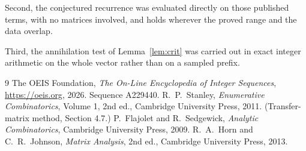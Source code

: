 \documentclass[11pt,a4paper]{article}
\theoremstyle{plain}
\theoremstyle{definition}
\begin{document}
Second, the conjectured recurrence was evaluated directly on those published terms, with no
matrices involved, and holds wherever the proved range and the data overlap.

Third, the annihilation test of Lemma~\ref{lem:crit} was carried out in exact integer
arithmetic on the whole vector rather than on a sampled prefix.

\begin{thebibliography}{9}
 The OEIS Foundation, \emph{The On-Line Encyclopedia of Integer
Sequences}, \url{https://oeis.org}, 2026. Sequence A229440.
 R.~P.~Stanley, \emph{Enumerative Combinatorics}, Volume 1, 2nd ed.,
Cambridge University Press, 2011. (Transfer-matrix method, Section 4.7.)
 P.~Flajolet and R.~Sedgewick, \emph{Analytic Combinatorics}, Cambridge
University Press, 2009.
 R.~A.~Horn and C.~R.~Johnson, \emph{Matrix Analysis}, 2nd ed., Cambridge
University Press, 2013.
\end{thebibliography}
\end{document}
